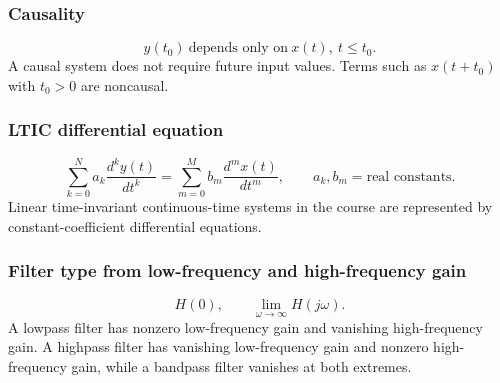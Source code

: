 \subsubsection{Causality}
\[
y(t_0)\ \text{depends only on}\ x(t),\ t\leq t_0.
\]
A causal system does not require future input values. Terms such as \(x(t+t_0)\) with \(t_0>0\) are noncausal.

\subsubsection{LTIC differential equation}
\[
\sum_{k=0}^{N}a_k\frac{d^k y(t)}{dt^k}
=
\sum_{m=0}^{M}b_m\frac{d^m x(t)}{dt^m},
\qquad a_k,b_m=\text{real constants}.
\]
Linear time-invariant continuous-time systems in the course are represented by constant-coefficient differential equations.

\subsubsection{Filter type from low-frequency and high-frequency gain}
\[
H(0), \qquad \lim_{\omega\to\infty}H(j\omega).
\]
A lowpass filter has nonzero low-frequency gain and vanishing high-frequency gain. A highpass filter has vanishing low-frequency gain and nonzero high-frequency gain, while a bandpass filter vanishes at both extremes.

